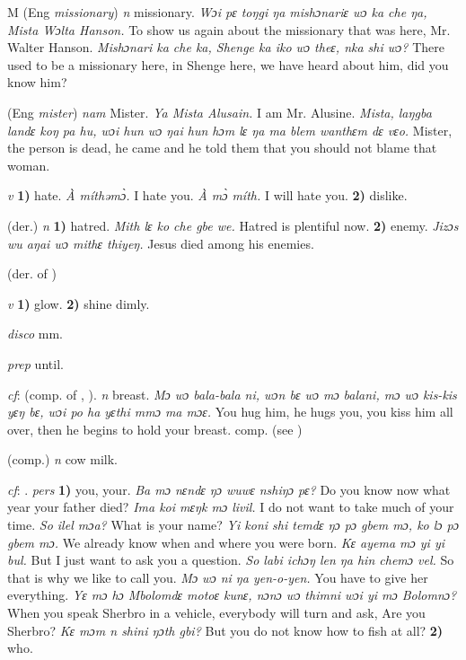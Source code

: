 \begin{letter}{M}
 (Eng \textit{missionary}) \textit{n} missionary. \textit{Wɔi pɛ toŋgi ŋa mishɔnariɛ wɔ ka che ŋa, Mista Wɔlta Hanson.} To show us again about the missionary that was here, Mr. Walter Hanson. \textit{Mishɔnari ka che ka, Shenge ka iko wɔ theɛ, nka shi wɔ?} There used to be a missionary here, in Shenge here, we have heard about him, did you know him?

 (Eng \textit{mister}) \textit{nam} Mister. \textit{Ya Mista Alusain.} I am Mr. Alusine. \textit{Mista, laŋgba landɛ koŋ pa hu, wɔi hun wɔ ŋai hun hɔm lɛ ŋa ma blem wanthɛm dɛ vɛo.} Mister, the person is dead, he came and he told them that you should not blame that woman.

 \textit{v} \textbf{1)} hate. \textit{À míthəmɔ̀.} I hate you. \textit{À mɔ̀ míth.} I will hate you. \textbf{2)} dislike.

 (der.) \textit{n} \textbf{1)} hatred. \textit{Mith lɛ ko che gbe we.} Hatred is plentiful now. \textbf{2)} enemy. \textit{Jizɔs wu aŋai wɔ mithɛ thiyeŋ.} Jesus died among his enemies.

 (der. of ) 

 \textit{v} \textbf{1)} glow. \textbf{2)} shine dimly.

 \textit{disco} mm.

 \textit{prep} until.

 \textit{cf}:  (comp. of , ). \textit{n} breast. \textit{Mɔ wɔ bala-bala ni, wɔn bɛ wɔ mɔ balani, mɔ wɔ kis-kis yɛŋ bɛ, wɔi po ha yɛthi mmɔ ma mɔɛ.} You hug him, he hugs you, you kiss him all over, then he begins to hold your breast. comp.  (see ) 

 (comp.) \textit{n} cow milk.

 \textit{cf}: . \textit{pers} \textbf{1)} you, your. \textit{Ba mɔ nɛndɛ ŋɔ wuwɛ nshiŋɔ pɛ?} Do you know now what year your father died? \textit{Ima koi mɛŋk mɔ livil.} I do not want to take much of your time. \textit{So ilel mɔa?} What is your name? \textit{Yi koni shi temdɛ ŋɔ pɔ gbem mɔ, ko lɔ pɔ gbem mɔ.} We already know when and where you were born. \textit{Kɛ ayema mɔ yi yi bul.} But I just want to ask you a question. \textit{So labi ichɔŋ len ŋa hin chemɔ vel.} So that is why we like to call you. \textit{Mɔ wɔ ni ŋa yen-o-yen.} You have to give her everything. \textit{Yɛ mɔ hɔ Mbolomdɛ motoɛ kunɛ, nɔnɔ wɔ thimni wɔi yi mɔ Bolomnɔ?} When you speak Sherbro in a vehicle, everybody will turn and ask, Are you Sherbro? \textit{Kɛ mɔm n shini ŋɔth gbi?} But you do not know how to fish at all? \textbf{2)} who.


\end{letter}
